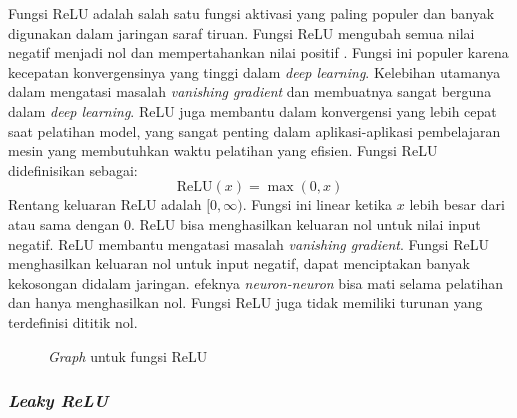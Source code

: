 Fungsi ReLU adalah salah satu fungsi aktivasi yang paling populer dan banyak digunakan dalam jaringan saraf tiruan. Fungsi ReLU mengubah semua nilai negatif menjadi nol dan mempertahankan nilai positif \cite{Kelleher2019-cj}. Fungsi ini populer karena kecepatan konvergensinya yang tinggi dalam \textit{deep learning}. Kelebihan utamanya dalam mengatasi masalah \textit{vanishing gradient} dan membuatnya sangat berguna dalam \textit{deep learning}. ReLU juga membantu dalam konvergensi yang lebih cepat saat pelatihan model, yang sangat penting dalam aplikasi-aplikasi pembelajaran mesin yang membutuhkan waktu pelatihan yang efisien. Fungsi ReLU didefinisikan sebagai:
\begin{equation}
    \text{ReLU}(x) = \max(0, x)
\end{equation}
Rentang keluaran ReLU adalah \([0, \infty)\). Fungsi ini linear ketika \(x\) lebih besar dari atau sama dengan 0. ReLU bisa menghasilkan keluaran nol untuk nilai input negatif. ReLU membantu mengatasi masalah \textit{vanishing gradient}. Fungsi ReLU menghasilkan keluaran nol untuk input negatif, dapat menciptakan banyak kekosongan didalam jaringan. efeknya \textit{neuron-neuron} bisa mati selama pelatihan dan hanya menghasilkan nol. Fungsi ReLU juga tidak memiliki turunan yang terdefinisi dititik nol.

\begin{figure}[H]
    \centering
    \caption{\textit{Graph} untuk fungsi ReLU}
    \label{fig:ReLU}
\end{figure}


\subsubsection{\textit{Leaky ReLU}}

